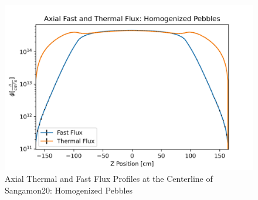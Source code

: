 \begin{figure}[H]
\centering

\includegraphics[width=0.95\linewidth]{figures/fast_therm_flux_homog_z.png}

\caption{Axial Thermal and Fast Flux Profiles at the Centerline of Sangamon20: Homogenized Pebbles}
\label{fig:hom-det-z}
\end{figure}